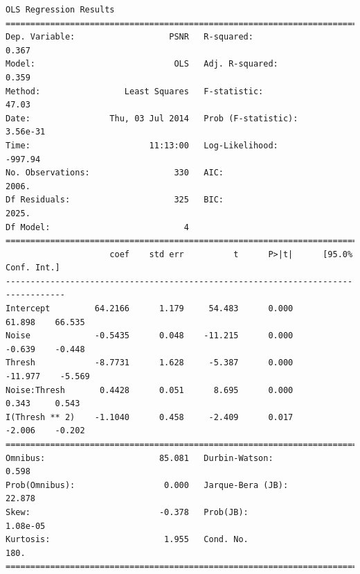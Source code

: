\documentclass[11pt]{article}
\theoremstyle{definition}
\begin{document}
{\begin{lstlisting}[caption = Time Series 2 - FFT Coefficient Thresholding OLS Model, label = {fftfilterseries2}]
                           OLS Regression Results                            
==============================================================================
Dep. Variable:                   PSNR   R-squared:                       0.367
Model:                            OLS   Adj. R-squared:                  0.359
Method:                 Least Squares   F-statistic:                     47.03
Date:                Thu, 03 Jul 2014   Prob (F-statistic):           3.56e-31
Time:                        11:13:00   Log-Likelihood:                -997.94
No. Observations:                 330   AIC:                             2006.
Df Residuals:                     325   BIC:                             2025.
Df Model:                           4                                         
==================================================================================
                     coef    std err          t      P>|t|      [95.0% Conf. Int.]
----------------------------------------------------------------------------------
Intercept         64.2166      1.179     54.483      0.000        61.898    66.535
Noise             -0.5435      0.048    -11.215      0.000        -0.639    -0.448
Thresh            -8.7731      1.628     -5.387      0.000       -11.977    -5.569
Noise:Thresh       0.4428      0.051      8.695      0.000         0.343     0.543
I(Thresh ** 2)    -1.1040      0.458     -2.409      0.017        -2.006    -0.202
==============================================================================
Omnibus:                       85.081   Durbin-Watson:                   0.598
Prob(Omnibus):                  0.000   Jarque-Bera (JB):               22.878
Skew:                          -0.378   Prob(JB):                     1.08e-05
Kurtosis:                       1.955   Cond. No.                         180.
==============================================================================
\end{lstlisting}

}
\end{document}
